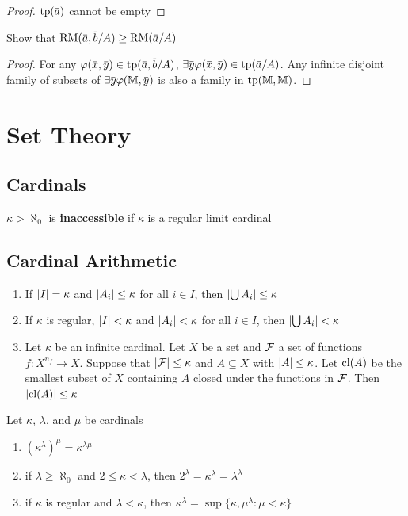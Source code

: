 \documentclass[11pt]{article}
\def \RM {\text{RM}}
\begin{document}
\begin{proof}
\(\tp(\bara)\) cannot be empty
\end{proof}

\begin{exercise}
\label{ex6.6.11}
Show that \(\RM(\bara,\barb/A)\ge\RM(\bara/A)\)
\end{exercise}

\begin{proof}
For any \(\varphi(\barx,\bary)\in\tp(\bara,\barb/A)\), \(\exists\bary\varphi(\barx,\bary)\in\tp(\bara/A)\). Any
infinite disjoint family of subsets of \(\exists\bary\varphi(\M,\bary)\) is also a family in \(\operatorname{tp}(\mathbb{M},\mathbb{M})\).
\end{proof}

\appendix
\section{Set Theory}
\label{sec:org32b88c7}
\subsection{Cardinals}
\label{sec:org0d78b7c}
\(\kappa>\aleph_0\) is \textbf{inaccessible} if \(\kappa\) is a regular limit cardinal
\subsection{Cardinal Arithmetic}
\label{sec:org673e5a8}
\begin{corollary}[]
\label{corA.15} 
\begin{enumerate}
\item If \(\abs{I}=\kappa\) and \(\abs{A_i}\le\kappa\) for all \(i\in I\), then 
\(\abs{\bigcup A_i}\le\kappa\)
\item If \(\kappa\) is regular, \(\abs{I}<\kappa\) and \(\abs{A_i}<\kappa\) for all 
\(i\in I\), then \(\abs{\bigcup A_i}<\kappa\)
\item Let \(\kappa\) be an infinite cardinal. Let \(X\) be a set and \(\mathcal{F}\) a set of
functions \(f:X^{n_f}\to X\). Suppose that \(\abs{\calf}\le\kappa\) and
\(A\subseteq X\) with \(\abs{A}\le\kappa\). Let \(\operatorname{\text{cl}}(A)\) be the smallest
subset of \(X\) containing \(A\) closed under the functions in \(\mathcal{F}\). Then 
\(\abs{\cl(A)}\le\kappa\)
\end{enumerate}
\end{corollary}

\begin{lemma}[]
Let \(\kappa\), \(\lambda\), and \(\mu\) be cardinals
\begin{enumerate}
\item \((\kappa^\lambda)^\mu=\kappa^{\lambda\mu}\)
\item if \(\lambda\ge\aleph_0\) and \(2\le\kappa<\lambda\), then \(2^\lambda=\kappa^\lambda=\lambda^\lambda\)
\item if \(\kappa\) is regular and \(\lambda<\kappa\), then \(\kappa^\lambda=\sup\{\kappa,\mu^\lambda:\mu<\kappa\}\)
\end{enumerate}
\end{lemma}
\end{document}
